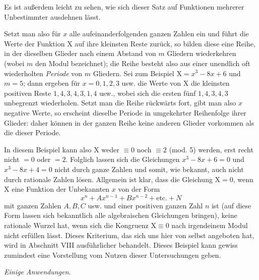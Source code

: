 Es ist außerdem leicht zu sehen, wie sich dieser Satz auf Funktionen mehrerer Unbestimmter ausdehnen lässt.


Setzt man also für $x$ alle aufeinanderfolgenden ganzen Zahlen ein und führt die Werte der Funktion $\mathrm{X}$ auf ihre kleinsten Reste zurück, so bilden diese eine Reihe, in der dieselben Glieder nach einem Abstand von $m$ Gliedern wiederkehren (wobei $m$ den Modul bezeichnet); die Reihe besteht also aus einer unendlich oft wiederholten \emph{Periode} von $m$ Gliedern. Sei zum Beispiel $\mathrm{X}=x^{3}-8x+6$ und $m=5$; dann ergeben für $x=0, 1, 2, 3$ usw. die Werte von $\mathrm{X}$ die kleinsten positiven Reste $1, 4, 3, 4, 3, 1, 4$ usw., wobei sich die ersten fünf $1, 4, 3, 4, 3$ unbegrenzt wiederholen. Setzt man die Reihe rückwärts fort, gibt man also $x$ negative Werte, so erscheint dieselbe Periode in umgekehrter Reihenfolge ihrer Glieder: daher können in der ganzen Reihe keine anderen Glieder vorkommen als die dieser Periode.


In diesem Beispiel kann also $\mathrm{X}$ weder $\equiv 0$ noch $\equiv 2$ (mod. 5) werden, erst recht nicht $=0$ oder $=2$. Folglich lassen sich die Gleichungen $x^{3}-8x+6=0$ und $x^{3}-8x+4=0$ nicht durch ganze Zahlen und somit, wie bekannt, auch nicht durch rationale Zahlen lösen. Allgemein ist klar, dass die Gleichung $\mathrm{X}=0$, wenn $\mathrm{X}$ eine Funktion der Unbekannten $x$ von der Form
\[
x^{n}+Ax^{n-1}+Bx^{n-2}+\text{etc.}+N
\]
mit ganzen Zahlen $A, B, C$ usw. und einer positiven ganzen Zahl $n$ ist (auf diese Form lassen sich bekanntlich alle algebraischen Gleichungen bringen), keine rationale Wurzel hat, wenn sich die Kongruenz $\mathrm{X}\equiv 0$ nach irgendeinem Modul nicht erfüllen lässt. Dieses Kriterium, das sich uns hier von selbst angeboten hat, wird in Abschnitt VIII ausführlicher behandelt. Dieses Beispiel kann gewiss zumindest eine Vorstellung vom Nutzen dieser Untersuchungen geben.

\begin{center}\emph{Einige Anwendungen.}\end{center}

